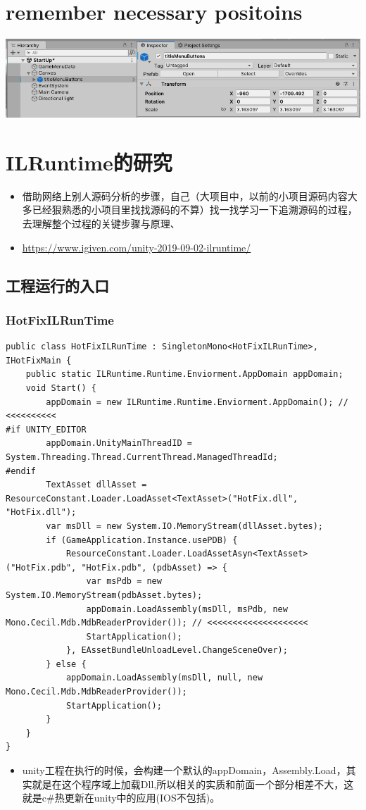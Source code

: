 \documentclass[9pt, b5paper]{article}
\begin{document}
\section{remember necessary positoins}
\label{sec-8}

\includegraphics[width=.9\linewidth]{./pic/readme_20220930_204953.png}



\section{ILRuntime的研究}
\label{sec-9}
\begin{itemize}
\item 借助网络上别人源码分析的步骤，自己（大项目中，以前的小项目源码内容大多已经狠熟悉的小项目里找找源码的不算）找一找学习一下追溯源码的过程，去理解整个过程的关键步骤与原理、
\item \url{https://www.igiven.com/unity-2019-09-02-ilruntime/}
\end{itemize}
\subsection{工程运行的入口}
\label{sec-9-1}
\subsubsection{HotFixILRunTime}
\label{sec-9-1-1}
\begin{verbatim}
public class HotFixILRunTime : SingletonMono<HotFixILRunTime>, IHotFixMain {
    public static ILRuntime.Runtime.Enviorment.AppDomain appDomain;
    void Start() {
        appDomain = new ILRuntime.Runtime.Enviorment.AppDomain(); // <<<<<<<<<< 
#if UNITY_EDITOR
        appDomain.UnityMainThreadID = System.Threading.Thread.CurrentThread.ManagedThreadId;
#endif
        TextAsset dllAsset = ResourceConstant.Loader.LoadAsset<TextAsset>("HotFix.dll", "HotFix.dll");
        var msDll = new System.IO.MemoryStream(dllAsset.bytes);
        if (GameApplication.Instance.usePDB) {
            ResourceConstant.Loader.LoadAssetAsyn<TextAsset>("HotFix.pdb", "HotFix.pdb", (pdbAsset) => {
                var msPdb = new System.IO.MemoryStream(pdbAsset.bytes);
                appDomain.LoadAssembly(msDll, msPdb, new Mono.Cecil.Mdb.MdbReaderProvider()); // <<<<<<<<<<<<<<<<<<<< 
                StartApplication();
            }, EAssetBundleUnloadLevel.ChangeSceneOver);
        } else {
            appDomain.LoadAssembly(msDll, null, new Mono.Cecil.Mdb.MdbReaderProvider());
            StartApplication();
        }
    }
}
\end{verbatim}
\begin{itemize}
\item unity工程在执行的时候，会构建一个默认的appDomain，Assembly.Load，其实就是在这个程序域上加载Dll,所以相关的实质和前面一个部分相差不大，这就是c\#热更新在unity中的应用(IOS不包括)。
\end{itemize}
\end{document}
